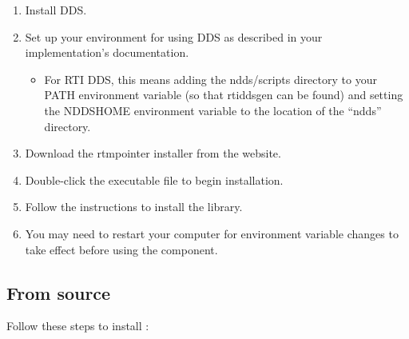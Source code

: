 \documentclass[a4paper,10pt]{article}
\begin{document}
\begin{enumerate}
  \item Install DDS.
  \item Set up your environment for using DDS as described in your
  implementation's documentation.
  \begin{itemize}
    \item For RTI DDS, this means adding the ndds/scripts directory to
    your PATH environment variable (so that rtiddsgen can be found) and
    setting the NDDSHOME environment variable to the location of the
    ``ndds'' directory.
  \end{itemize}
  \item Download the rtmpointer installer from the website.
  \item Double-click the executable file to begin installation.
  \item Follow the instructions to install the library.
  \item You may need to restart your computer for environment variable
  changes to take effect before using the component.
\end{enumerate}

\subsection{From source}

Follow these steps to install :
\end{document}

